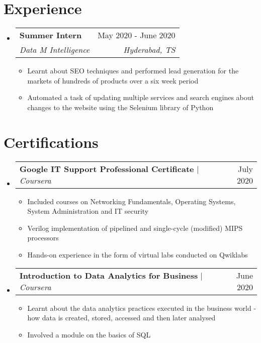 \documentclass[a4paper,11pt]{article}
\makeatletter
\newcommand{\resumeItem}[1]{
  \item\small{
    {#1 \vspace{-2pt}}
  }
}
\newcommand{\resumeSubheading}[4]{
  \vspace{-2pt}\item
    \begin{tabular*}{0.97\textwidth}[t]{l@{\extracolsep{\fill}}r}
      \textbf{#1} & #2 \\
      \textit{\small#3} & \textit{\small #4} \\
    \end{tabular*}\vspace{-7pt}
}
\newcommand{\resumeProjectHeading}[2]{
    \item
    \begin{tabular*}{0.97\textwidth}{l@{\extracolsep{\fill}}r}
      \small#1 & #2 \\
    \end{tabular*}\vspace{-7pt}
}
\newcommand{\resumeSubHeadingListStart}{\begin{itemize}[leftmargin=0.15in, label={}]}
\newcommand{\resumeSubHeadingListEnd}{\end{itemize}}
\newcommand{\resumeItemListStart}{\begin{itemize}}
\newcommand{\resumeItemListEnd}{\end{itemize}\vspace{-5pt}}
\makeatother
\begin{document}
\section{Experience}
  \resumeSubHeadingListStart

    \resumeSubheading
      {Summer Intern}{May 2020 - June 2020}
      {Data M Intelligence}{Hyderabad, TS}
      \resumeItemListStart
        \resumeItem{Learnt about SEO techniques and performed lead generation for the markets of hundreds of products over a six week period}
        \resumeItem{Automated a task of updating multiple services and search engines about changes to the website using the Selenium library of Python}
      \resumeItemListEnd
  \resumeSubHeadingListEnd

\section{Certifications}
    \resumeSubHeadingListStart
      \resumeProjectHeading
          {\textbf{Google IT Support Professional Certificate} $|$ \emph{Coursera}}{July 2020}
          \resumeItemListStart
            \resumeItem{Included courses on Networking Fundamentals, Operating Systems, System Administration and IT security}
            \resumeItem{Verilog implementation of pipelined and single-cycle (modified) MIPS processors}
            \resumeItem{Hands-on experience in the form of virtual labs conducted on Qwiklabs}
          \resumeItemListEnd
      \resumeProjectHeading
          {\textbf{Introduction to Data Analytics for Business} $|$ \emph{Coursera}}{June 2020}
          \resumeItemListStart
            \resumeItem{Learnt about the data analytics practices executed in the business world - how data is created, stored, accessed and then later analysed}
            \resumeItem{Involved a module on the basics of SQL}
          \resumeItemListEnd
    \resumeSubHeadingListEnd
\end{document}
